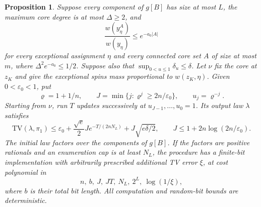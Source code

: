 \documentclass[11pt]{article}
\newcommand{\TV}{\mathrm{TV}}
\newtheorem{proposition}[thm]{Proposition}
\numberwithin{equation}{section}
\begin{document}
\begin{proposition}\label{ph:initialized}
Suppose every component of $g[B]$ has size at most $L$, the maximum core degree is at most $\Delta\ge2$, and
\[
    \frac{w(y_\eta^A)}{w(y_\eta)}\le e^{-a_0|A|}
\]
for every exceptional assignment $\eta$ and every connected core set $A$ of size at most $m$, where $\Delta^2e^{-a_0}\le1/2$. Suppose also that $\sup_{0<u\le1}\delta_u\le\delta$.
Let $\nu$ fix the core at $z_K$ and give the exceptional spins mass proportional to $w(z_K,\eta)$. Given $0<\varepsilon_0<1$, put
\[
 \varrho=1+1/n,\qquad
 J=\min\{j:\varrho^j\ge2n/\varepsilon_0\},\qquad u_j=\varrho^{-j}.
\]
Starting from $\nu$, run $T$ updates successively at $u_{J-1},\ldots,u_0=1$. Its output law $\lambda$ satisfies
\begin{equation}\label{ph:anneal_error}
 \TV(\lambda,\pi_1)
 \le\varepsilon_0+\frac{\sqrt e}{2}J e^{-T/(2nN_L)}
                    +J\sqrt{e\delta/2},
 \qquad J\le1+2n\log(2n/\varepsilon_0).
\end{equation}
The initial law factors over the components of $g[B]$. If the factors are positive rationals and an enumeration cap is at least $N_L$, the procedure has a finite-bit implementation with arbitrarily prescribed additional TV error $\xi$, at cost polynomial in
\[
    n,\ b,\ J,\ JT,\ N_L,\ 2^L,\ \log(1/\xi),
\]
where $b$ is their total bit length. All computation and random-bit bounds are deterministic.
\end{proposition}
\end{document}
